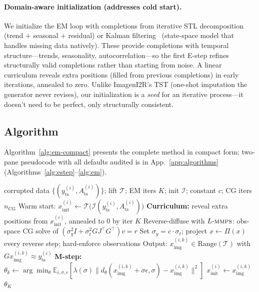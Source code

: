 \documentclass{article}
\theoremstyle{plain}
\theoremstyle{definition}
\theoremstyle{remark}
\newcommand{\tsimg}{\mathcal{T}}
\newcommand{\pslr}{\textsc{pslr}}
\newcommand{\lmmps}{L\mbox{-}\textsc{mmps}}
\newcommand{\Ats}{A_{\mathrm{ts}}}
\newcommand{\yts}{y_{\mathrm{ts}}}
\newcommand{\ximg}{x_{\mathrm{img}}}
\begin{document}
\paragraph{Domain-aware initialization (addresses cold start).}
We initialize the EM loop with completions from iterative STL decomposition~\citep{cleveland1990stl} (trend $+$ seasonal $+$ residual) or Kalman filtering~\citep{kalman1960new} (state-space model that handles missing data natively). These provide completions with temporal structure---trends, seasonality, autocorrelation---so the first E-step refines structurally valid completions rather than starting from noise. A linear curriculum reveals extra positions (filled from previous completions) in early iterations, annealed to zero. Unlike ImagenI2R's TST (one-shot imputation the generator never revises), our initialization is a \emph{seed} for an iterative process---it doesn't need to be perfect, only structurally consistent.

\vspace{-1mm}
\subsection{Algorithm}
\label{subsec:algorithm}
\vspace{-1mm}

Algorithm~\ref{alg:em-compact} presents the complete method in compact form; two-pane pseudocode with all defaults audited is in App.~\ref{app:algorithms} (Algorithms~\ref{alg:estep}--\ref{alg:em}).

\begin{algorithm}[h]
\caption{Co-Evolving EM with $\lmmps$ E-step (compact)}
\label{alg:em-compact}
\begin{algorithmic}[1]
\Require corrupted data $\{(\yts^{(i)}, \Ats^{(i)})\}$; lift $\tsimg$; EM iters $K$; init $\mathcal{I}$; constant $c$; CG iters $n_{\mathrm{CG}}$
\State Warm start: $x_{\mathrm{init}}^{(i)} \gets \tsimg \bigl(\mathcal{I}(\yts^{(i)}, \Ats^{(i)})\bigr)$ 
  \State \textbf{Curriculum:} reveal extra positions from $x_{\mathrm{init}}^{(i)}$, annealed to $0$ by iter $K$
   
    \State Reverse-diffuse with $\lmmps$: obs-space CG solve of $(\sigma_y^2 I + \sigma_t^2 G J^\top G^\top) v = r$ \Comment{\pslr{}(MMPS)}
    \State Set $\sigma_y = c \cdot \sigma_t$; project $x \gets \Pi(x)$ every reverse step; hard-enforce observations
    \State Output: $\ximg^{(i,k)} \in \mathrm{Range}(\tsimg)$ with $G \ximg^{(i,k)} \approx \yts^{(i)}$
  \EndFor
  \State \textbf{M-step:} $\theta_k \gets \arg\min_\theta \mathbb{E}_{i,\sigma,\epsilon}[\lambda(\sigma) \|d_\theta(\ximg^{(i,k)} + \sigma\epsilon, \sigma) - \ximg^{(i,k)}\|^2]$
  \State $x_{\mathrm{init}}^{(i)} \gets \ximg^{(i,k)}$ 
\EndFor
\State \Return $\theta_K$
\end{algorithmic}
\end{algorithm}
\end{document}
